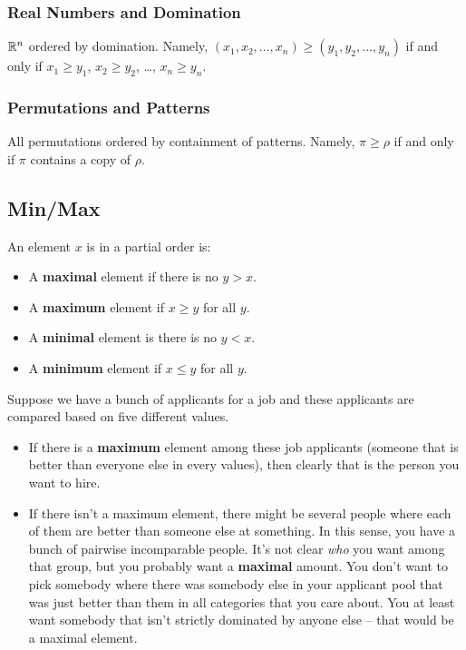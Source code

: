 \documentclass[letterpaper]{article}
\begin{document}
\subsubsection{Real Numbers and Domination}
$\mathbb{R}^n$ ordered by domination. Namely, $(x_1, x_2, \dots, x_n) \geq (y_1, y_2, \dots, y_n)$ if and only if $x_1 \geq y_1$, $x_2 \geq y_2$, \dots, $x_n \geq y_n$. 

\subsubsection{Permutations and Patterns}
All permutations ordered by containment of patterns. Namely, $\pi \geq \rho$ if and only if $\pi$ contains a copy of $\rho$. 


\subsection{Min/Max}
\begin{definition}{}{}
    An element $x$ is in a partial order is:
    \begin{itemize}
        \item A \textbf{maximal} element if there is no $y > x$. 
        \item A \textbf{maximum} element if $x \geq y$ for all $y$. 
        \item A \textbf{minimal} element is there is no $y < x$. 
        \item A \textbf{minimum} element if $x \leq y$ for all $y$. 
    \end{itemize}
\end{definition}
Suppose we have a bunch of applicants for a job and these applicants are compared based on five different values. 
\begin{itemize}
    \item If there is a \textbf{maximum} element among these job applicants (someone that is better than everyone else in every values), then clearly that is the person you want to hire.
    \item If there isn't a maximum element, there might be several people where each of them are better than someone else at something. In this sense, you have a bunch of pairwise incomparable people. It's not clear \emph{who} you want among that group, but you probably want a \textbf{maximal} amount. You don't want to pick somebody where there was somebody else in your applicant pool that was just better than them in all categories that you care about. You at least want somebody that isn't strictly dominated by anyone else -- that would be a maximal element.
\end{itemize} 
\end{document}
